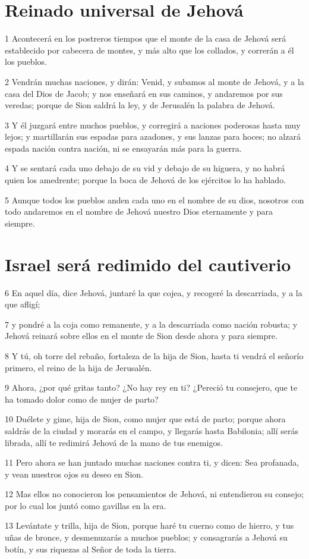 \section*{Reinado universal de Jehová}

\par 1 Acontecerá en los postreros tiempos que el monte de la casa de Jehová será establecido por cabecera de montes, y más alto que los collados, y correrán a él los pueblos.
\par 2 Vendrán muchas naciones, y dirán: Venid, y subamos al monte de Jehová, y a la casa del Dios de Jacob; y nos enseñará en sus caminos, y andaremos por sus veredas; porque de Sion saldrá la ley, y de Jerusalén la palabra de Jehová.
\par 3 Y él juzgará entre muchos pueblos, y corregirá a naciones poderosas hasta muy lejos; y martillarán sus espadas para azadones, y sus lanzas para hoces; no alzará espada nación contra nación, ni se ensayarán más para la guerra.
\par 4 Y se sentará cada uno debajo de su vid y debajo de su higuera, y no habrá quien los amedrente; porque la boca de Jehová de los ejércitos lo ha hablado.
\par 5 Aunque todos los pueblos anden cada uno en el nombre de su dios, nosotros con todo andaremos en el nombre de Jehová nuestro Dios eternamente y para siempre.

\section*{Israel será redimido del cautiverio}

\par 6 En aquel día, dice Jehová, juntaré la que cojea, y recogeré la descarriada, y a la que afligí;
\par 7 y pondré a la coja como remanente, y a la descarriada como nación robusta; y Jehová reinará sobre ellos en el monte de Sion desde ahora y para siempre.
\par 8 Y tú, oh torre del rebaño, fortaleza de la hija de Sion, hasta ti vendrá el señorío primero, el reino de la hija de Jerusalén.
\par 9 Ahora, ¿por qué gritas tanto? ¿No hay rey en ti? ¿Pereció tu consejero, que te ha tomado dolor como de mujer de parto?
\par 10 Duélete y gime, hija de Sion, como mujer que está de parto; porque ahora saldrás de la ciudad y morarás en el campo, y llegarás hasta Babilonia; allí serás librada, allí te redimirá Jehová de la mano de tus enemigos.
\par 11 Pero ahora se han juntado muchas naciones contra ti, y dicen: Sea profanada, y vean nuestros ojos su deseo en Sion.
\par 12 Mas ellos no conocieron los pensamientos de Jehová, ni entendieron su consejo; por lo cual los juntó como gavillas en la era.
\par 13 Levántate y trilla, hija de Sion, porque haré tu cuerno como de hierro, y tus uñas de bronce, y desmenuzarás a muchos pueblos; y consagrarás a Jehová su botín, y sus riquezas al Señor de toda la tierra.

